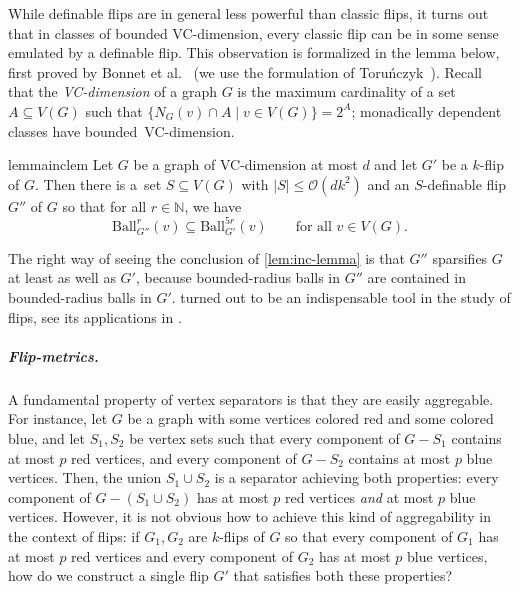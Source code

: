 \documentclass[a4paper,UKenglish,cleveref, autoref, thm-restate]{lipics-v2021}
\newcommand{\N}[0]{\mathrm{\mathbb{N}}}
\renewcommand{\subset}{\subseteq}
\newcommand{\setof}[2]{\{#1\mid#2\}}
\renewcommand{\le}{\leqslant}
\newcommand{\Ball}{\mathrm{Ball}}
\newcommand{\Oh}{\mathcal{O}}
\begin{document}
While definable flips are in general less powerful than classic flips, it turns out that in classes of bounded VC-dimension, every classic flip can be in some sense emulated by a definable flip. This observation is formalized in the lemma below, first proved by Bonnet et al.~\cite{boundedLocalCliquewidth} (we use the formulation of Toru\'nczyk~\cite{flip-width}). Recall that the \emph{VC-dimension} of a graph $G$ is the maximum cardinality of a set $A\subset V(G)$ such that $\setof{N_G(v)\cap A}{v\in V(G)}=2^A$; monadically dependent classes have bounded~VC-dimension.


\begin{restatable}{lemma}{inclem}\label{lem:inc-lemma}
  Let $G$ be a graph of VC-dimension at most $d$ and let $G'$ be a $k$-flip of $G$.
  Then there is a~set $S\subset V(G)$ with $|S|\le \Oh(dk^2)$ and an $S$-definable flip $G''$ of $G$
  so that for all $r\in\N$, we have
  $$\Ball^r_{G''}(v)\subset \Ball^{5r}_{G'}(v)\qquad\text{for all $v\in V(G)$.}$$
\end{restatable}

The right way of seeing the conclusion of \cref{lem:inc-lemma} is that $G''$ sparsifies $G$ at least as well as $G'$, because bounded-radius balls in $G''$ are contained in bounded-radius balls in $G'$.
 turned out to be an indispensable tool in the study of flips, see its applications in \cite{boundedLocalCliquewidth,definable-decompositions,flip-width}.

\subparagraph*{Flip-metrics.} A fundamental property of vertex separators is that they are easily aggregable. For instance, let $G$ be a graph with some vertices colored red and some colored blue, and let $S_1,S_2$ be vertex sets such that every component of $G-S_1$ contains at most $p$ red vertices, and every component of $G-S_2$ contains at most $p$ blue vertices. Then, the union $S_1\cup S_2$ is a separator achieving both properties: every component of $G-(S_1\cup S_2)$ has at most $p$ red vertices {\em{and}} at most $p$ blue vertices. However, it is not obvious how to achieve this kind of aggregability in the context of flips: if $G_1,G_2$ are $k$-flips of $G$ so that  every component of $G_1$ has at most $p$ red vertices and every component of $G_2$ has at most $p$ blue vertices, how do we construct a single flip $G'$ that satisfies both these properties?
\end{document}
